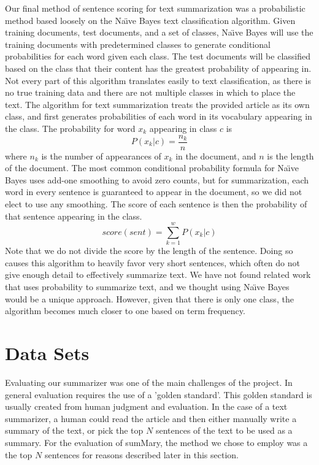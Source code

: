 \documentclass[11pt,a4paper]{article}
\begin{document}
Our final method of sentence scoring for text summarization was a probabilistic method based loosely on the Na{\"\i}ve Bayes text classification algorithm. Given training documents, test documents, and a set of classes, Na{\"\i}ve Bayes will use the training documents with predetermined classes to generate conditional probabilities for each word given each class. The test documents will be classified based on the class that their content has the greatest probability of appearing in. Not every part of this algorithm translates easily to text classification, as there is no true training data and there are not multiple classes in which to place the text. The algorithm for text summarization treats the provided article as its own class, and first generates probabilities of each word in its vocabulary appearing in the class. The probability for word $x_k$ appearing in class $c$ is
$$P(x_k|c) = \frac{n_k}{n}$$
where $n_k$ is the number of appearances of $x_k$ in the document, and $n$ is the length of the document. The most common conditional probability formula for Na{\"\i}ve Bayes uses add-one smoothing to avoid zero counts, but for summarization, each word in every sentence is guaranteed to appear in the document, so we did not elect to use any smoothing. The score of each sentence is then the probability of that sentence appearing in the class.
$$score(sent) = \sum_{k = 1}^{w} P(x_k|c)$$
Note that we do not divide the score by the length of the sentence. Doing so causes this algorithm to heavily favor very short sentences, which often do not give enough detail to effectively summarize text.
We have not found related work that uses probability to summarize text, and we thought using Na{\"\i}ve Bayes would be a unique approach. However, given that there is only one class, the algorithm becomes much closer to one based on term frequency.

\section{Data Sets}

Evaluating our summarizer was one of the main challenges of the project. In general evaluation requires the use of a 'golden standard'. This golden standard is usually created from human judgment and evaluation. In the case of a text summarizer, a human could read the article and then either manually write a summary of the text, or pick the top $N$ sentences of the text to be used as a summary. For the evaluation of sumMary, the method we chose to employ was a the top $N$ sentences for reasons described later in this section. 
\end{document}
